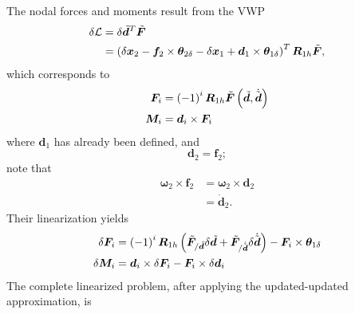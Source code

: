\documentclass[10pt,dvips,fleqn,subeqn]{report}
\newcommand{\T}[1]{\bm{#1}}
\begin{document}
The nodal forces and moments result from the VWP
\begin{align}
	\delta\mathcal{L}
	&= \delta \tilde{\T{d}}^T \tilde{\T{F}} \nonumber \\
	&= \plbr{
		\delta{\T{x}}_2
		- \T{f}_2\times\T{\theta}_{2\delta}
		- \delta{\T{x}}_1
		+ \T{d}_1\times\T{\theta}_{1\delta}
	}^T \T{R}_{1h} \tilde{\T{F}} ,
\end{align}
which corresponds to
\begin{subequations}
\begin{align}
	\T{F}_i &= \plbr{ -1 }^i \T{R}_{1h} \tilde{\T{F}}\plbr{\tilde{\T{d}}, \dot{\tilde{\T{d}}}} \\
	\T{M}_i &= \T{d}_i \times \T{F}_i
\end{align}
\end{subequations}
where $\T{d}_1$ has already been defined, and
\begin{equation}
	\T{d}_2 = \T{f}_2 ;
\end{equation}
note that
\begin{align}
	\T{\omega}_2\times\T{f}_2
	&= \T{\omega}_2\times\T{d}_2 \nonumber \\
	&= \dot{\T{d}}_2 .
\end{align}
Their linearization yields
\begin{subequations}
\begin{align}
	\delta\T{F}_i
	&= \plbr{ -1 }^i \T{R}_{1h} \plbr{
		\tilde{\T{F}}_{/\tilde{\T{d}}} \delta{\tilde{\T{d}}}
		+ \tilde{\T{F}}_{/\dot{\tilde{\T{d}}}} \delta\dot{\tilde{\T{d}}}
	} - \T{F}_i \times \T{\theta}_{1\delta} \\
	\delta\T{M}_i
	&= \T{d}_i \times \delta\T{F}_i
	- \T{F}_i \times \delta \T{d}_i
\end{align}
\end{subequations}
The complete linearized problem, after applying the updated-updated 
approximation, is
\end{document}
